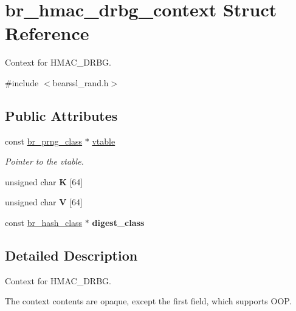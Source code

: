 \hypertarget{structbr__hmac__drbg__context}{}\section{br\+\_\+hmac\+\_\+drbg\+\_\+context Struct Reference}
\label{structbr__hmac__drbg__context}


Context for H\+M\+A\+C\+\_\+\+D\+R\+BG.  




{\ttfamily \#include $<$bearssl\+\_\+rand.\+h$>$}

\subsection*{Public Attributes}
\begin{DoxyCompactItemize}
\item 
const \hyperlink{bearssl__rand_8h_a249aef3beeba050eea56048e6a479fba}{br\+\_\+prng\+\_\+class} $\ast$ \hyperlink{structbr__hmac__drbg__context_a273d6a6f75ec5da343f43ca800ad9f52}{vtable}
\begin{DoxyCompactList}\small\item\em Pointer to the vtable. \end{DoxyCompactList}\item 
\mbox{\label{structbr__hmac__drbg__context_a6d8fa50af6777413c2e1d9b4bd618050}} 
unsigned char {\bfseries K} \mbox{[}64\mbox{]}
\item 
\mbox{\label{structbr__hmac__drbg__context_a5a3f78c9bf0724b92ef5efd017e1bcc4}} 
unsigned char {\bfseries V} \mbox{[}64\mbox{]}
\item 
\mbox{\label{structbr__hmac__drbg__context_a787f46e281b985e688ce74862abc7e40}} 
const \hyperlink{bearssl__hash_8h_ae38c1b9d539537cc16fc84388b922d86}{br\+\_\+hash\+\_\+class} $\ast$ {\bfseries digest\+\_\+class}
\end{DoxyCompactItemize}


\subsection{Detailed Description}
Context for H\+M\+A\+C\+\_\+\+D\+R\+BG. 

The context contents are opaque, except the first field, which supports O\+OP. 

